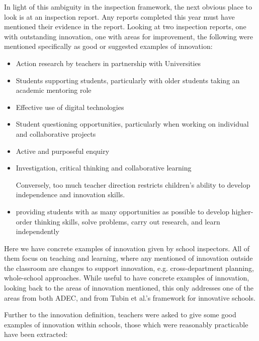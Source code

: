 In light of this ambiguity in the inspection framework, the next obvious place to look is at an inspection report. Any reports completed this year must have mentioned their evidence in the report. Looking at two inspection reports, one with outstanding innovation, one with areas for improvement, the following were mentioned specifically as good or suggested examples of innovation:
\begin{itemize}
\item Action research by teachers in partnership with Universities
\item Students supporting students, particularly with older students taking an academic mentoring role
\item Effective use of digital technologies
\item Student questioning opportunities, particularly when working on individual and collaborative projects
\item Active and purposeful enquiry 
\item Investigation, critical thinking and collaborative learning
\item [Conversely,] too much teacher direction restricts children’s ability to develop independence and innovation skills.
\item providing students with as many opportunities as possible to develop higher-order thinking skills, solve problems, carry out research, and learn independently
\end{itemize}

Here we have concrete examples of innovation given by school inspectors. All of them focus on teaching and learning, where any mentioned of innovation outside the classroom are changes to support innovation, e.g. cross-department planning, whole-school approaches. While useful to have concrete examples of innovation, looking back to the areas of innovation mentioned, this only addresses one of the areas from both ADEC, and from Tubin et al.'s framework for innovative schools.

Further to the innovation definition, teachers were asked to give some good examples of innovation within schools, those which were reasonably practicable have been extracted: 

